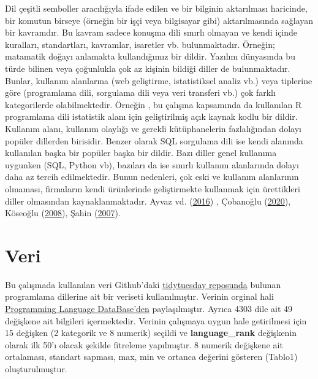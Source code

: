 \documentclass[
  12pt,
]{article}
\begin{document}
Dil çeşitli semboller aracılığıyla ifade edilen ve bir bilginin aktarılması haricinde, bir komutun birseye (örneğin bir işçi veya bilgisayar gibi) aktarılmasında sağlayan bir kavramdır. Bu kavram sadece konuşma dili sınırlı olmayan ve kendi içinde kuralları, standartları, kavramlar, isaretler vb. bulunmaktadır. Örneğin; matamatik doğayı anlamakta kullandığımız bir dildir.
Yazılım dünyasında bu türde bilinen veya çoğunlukla çok az kişinin bildiği diller de bulunmaktadır. Bunlar, kullanım alanlarına (web geliştirme, istatistiksel analiz vb.) veya tiplerine göre (programlama dili, sorgulama dili veya veri transferi vb.) çok farklı kategorilerde olabilmektedir. Örneğin , bu çalışma kapsamında da kullanılan R programlama dili istatistik alanı için geliştirilmiş açık kaynak kodlu bir dildir. Kullanım alanı, kullanım olaylığı ve gerekli kütüphanelerin fazlalığından dolayı popüler dillerden birisidir. Benzer olarak SQL sorgulama dili ise kendi alanında kullanılan başka bir popüler başka bir dildir. Bazı diller genel kullanıma uygunken (SQL, Python vb), bazıları da ise sınırlı kullanım alanlarında dolayı daha az tercih edilmektedir. Bunun nedenleri, çok eski ve kullanım alanlarının olmaması, firmaların kendi ürünlerinde geliştirmekte kullanmak için ürettikleri diller olmasından kaynaklanmaktadır. Ayvaz vd. (\protect\hyperlink{ref-ayvaz2016python}{2016}) , Çobanoğlu (\protect\hyperlink{ref-ccobanouglu2020herkes}{2020}), Köseoğlu (\protect\hyperlink{ref-koseouglu2008veritabani}{2008}), Şahin (\protect\hyperlink{ref-csahin2007java}{2007}).

\hypertarget{veri}{%
\section{Veri}\label{veri}}

Bu çalışmada kullanılan veri Github'daki \href{https://github.com/rfordatascience/tidytuesday/tree/master/data/2023/2023-03-21}{tidytuesday reposunda} bulunan programlama dillerine ait bir veriseti kullanılmıştır. Verinin orginal hali \href{https://pldb.com/}{Programming Language DataBase'den} paylaşılmıştır. Ayrıca 4303 dile ait 49 değişkene ait bilgileri içermektedir. Verinin çalışmaya uygun hale getirilmesi için 15 değişken (2 kategorik ve 8 numerik) seçildi ve \textbf{language\_rank} değişkenin olarak ilk 50'ı olacak şekilde fitreleme yapılmıştır. 8 numerik değişkene ait ortalaması, standart sapması, max, min ve ortanca değerini gösteren (Tablo1) oluşturulmuştur.
\end{document}
